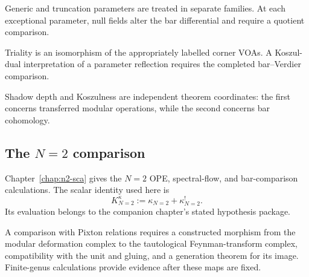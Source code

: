 \begin{remark}
\label{rem:y-algebra-non-generic-locus}
Generic and truncation parameters are treated in separate families.
At each exceptional parameter, null fields alter the bar differential
and require a quotient comparison.
\end{remark}

\begin{remark}
\label{rem:y-algebra-koszul-duality-compat}
Triality is an isomorphism of the appropriately labelled corner
VOAs.  A Koszul-dual interpretation of a parameter reflection
requires the completed bar--Verdier comparison.
\end{remark}

\begin{remark}
\label{rem:y-algebra-depth-classification-deep-summary}
Shadow depth and Koszulness are independent theorem coordinates:
the first concerns transferred modular operations, while the second
concerns bar cohomology.
\end{remark}

\subsection{The \(N=2\) comparison}
\label{sec:n2-shadow-tower}

\begin{remark}[\(N=2\) superconformal algebra]
\label{thm:n2-kappa}
\label{rem:n2-sca-koszulness}
\label{rem:n2-spectral-flow-invariance}
Chapter~\ref{chap:n2-sca} gives the \(N=2\) OPE, spectral-flow, and
bar-comparison calculations.  The scalar identity used here is
\begin{equation}
\label{eq:n2-complementarity}
K^\kappa_{N=2}
:=\kappa_{N=2}+\kappa_{N=2}^{!}.
\end{equation}
Its evaluation belongs to the companion chapter's stated hypothesis
package.
\end{remark}

\begin{conjecture}
\label{conj:pixton-from-shadows}
\ClaimStatusConjectured
A comparison with Pixton relations requires a constructed morphism
from the modular deformation complex to the tautological
Feynman-transform complex, compatibility with the unit and gluing,
and a generation theorem for its image.  Finite-genus calculations
provide evidence after these maps are fixed.
\end{conjecture}


